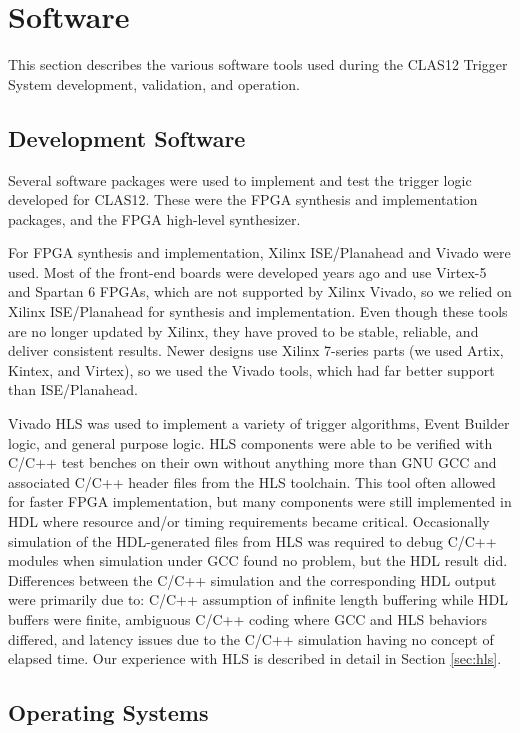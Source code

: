 \section{Software}

This section describes the various software tools used during the CLAS12 Trigger System development,
validation, and operation.

\subsection{Development Software}

Several software packages were used to implement and test the trigger logic developed for CLAS12. These
were the FPGA synthesis and implementation packages, and the FPGA high-level synthesizer.

For FPGA synthesis and implementation, Xilinx ISE/Planahead and Vivado were used. Most of the front-end
boards were developed years ago and use Virtex-5 and Spartan 6 FPGAs, which are not supported by Xilinx
Vivado, so we relied on Xilinx ISE/Planahead for synthesis and implementation. Even though these tools are no
longer updated by Xilinx, they have proved to be stable, reliable, and deliver consistent results. Newer designs
use Xilinx 7-series parts (we used Artix, Kintex, and Virtex), so we used the Vivado tools, which had far better
support than ISE/Planahead.

Vivado HLS was used to implement a variety of trigger algorithms, Event Builder logic, and general purpose
logic. HLS components were able to be verified with C/C++ test benches on their own without anything more
than GNU GCC and associated C/C++ header files from the HLS toolchain. This tool often allowed for faster
FPGA implementation, but many components were still implemented in HDL where resource and/or timing
requirements became critical. Occasionally simulation of the HDL-generated files from HLS was required
to debug C/C++ modules when simulation under GCC found no problem, but the HDL result did. Differences
between the C/C++ simulation and the corresponding HDL output were primarily due to: C/C++ assumption of
infinite length buffering while HDL buffers were finite, ambiguous C/C++ coding where GCC and HLS behaviors
differed, and latency issues due to the C/C++ simulation having no concept of elapsed time. Our experience with
HLS is described in detail in Section \ref{sec:hls}.

\subsection{Operating Systems}

